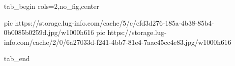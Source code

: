  
 
 
 
 


\ifcmt
  tab_begin cols=2,no_fig,center

     pic https://storage.lug-info.com/cache/5/c/efd3d276-185a-4b38-85b4-0b0085b0259d.jpg/w1000h616
		 pic https://storage.lug-info.com/cache/2/0/6a27033d-f241-4bb7-81e4-7aac45cc4e83.jpg/w1000h616

  tab_end
\fi
